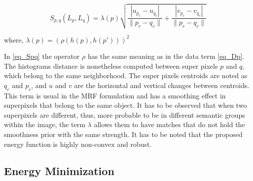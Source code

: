 \documentclass[a4paper, 10pt, conference]{ieeeconf}      %
\begin{document}
\begin{equation}
S_{p,q}(L_p,L_q) = \lambda(p)
  \sqrt{\frac{|u_{p_c}-u_{q_c}|}{\|p_c-q_c\|}+ \frac{|v_{p_c}-v_{q_c}|}{\|p_c-q_c\|}}
\label{eq_Spq}
\end{equation}
\begin{center}
 where, $ \lambda(p) = (\rho(h(p),h(p')))^2 $ \\
\end{center}

In \ref{eq_Spq} the operator $\rho$ has the same meaning as in the
data term \ref{eq_Dp}. The histograms distance is nonetheless
computed between super pixels $p$ and $q$, which belong to
the same neighborhood. The super pixels
centroids are noted as $q_c$ and $p_c$, and $u$ and $v$ are the
horizontal and vertical changes between centroids.
This term is usual in the MRF formulation and has a
smoothing effect in superpixels that belong to the
same object. It has to be observed that when two
superpixels are different, thus, more probable to be
in different semantic groups within the image, the
term $\lambda$ allows them to have
matches that do not hold the smoothness prior with the same strength. 
It has to be noted that the proposed energy function is
highly non-convex and robust.

\subsection{Energy Minimization}
\end{document}
